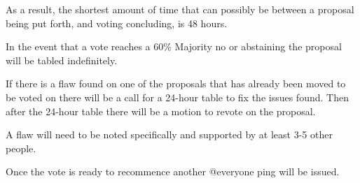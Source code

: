 \begin{deepEnumerate}
\begin{deepEnumerate}
    \end{deepEnumerate}
    \item As a result, the shortest amount of time that can possibly be between a proposal being put forth, and voting concluding, is 48 hours.
    \item In the event that a vote reaches a 60\% Majority no or abstaining the proposal will be tabled indefinitely.
    \item If there is a flaw found on one of the proposals that has already been moved to be voted on there will be a call for a 24-hour table to fix the issues found. 
    Then after the 24-hour table there will be a motion to revote on the proposal.
    \begin{deepEnumerate}
        \item A flaw will need to be noted specifically and supported by at least 3-5 other people.
        \item Once the vote is ready to recommence another @everyone ping will be issued.
    \end{deepEnumerate}
\end{deepEnumerate}

